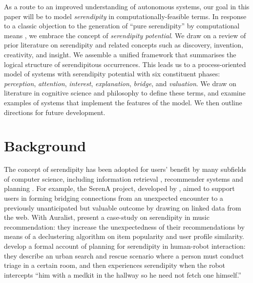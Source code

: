 As a route to an improved understanding of autonomous systems, our goal in this paper will be to model \emph{serendipity} in computationally-feasible terms. In response to a classic objection to the generation of ``pure serendipity'' by computational means \cite{van1994anatomy},  we embrace the concept of \emph{serendipity potential}.
We draw on a review of prior literature on serendipity and related concepts such as discovery, invention, creativity, and insight.  We assemble a unified framework that summarises the logical structure of serendipitous occurrences.
This leads us to a process-oriented model of systems with serendipity potential with six constituent phases:
\emph{perception}, \emph{attention}, \emph{interest}, \emph{explanation}, \emph{bridge}, and \emph{valuation}.
We draw on literature in cognitive science and philosophy to define these terms, and examine examples of systems that implement the features of the model.
We then outline directions for future development.

\section{Background} \label{sec:background}

The concept of serendipity has been adopted for users' benefit by many subfields of computer science, including information retrieval \cite{Toms2000, Andre:2009:XSP:1518701.1519009}, recommender systems \cite{kotkov2016survey} and planning \cite{muscettola1997board, chakraborti2015planning}. For example, the {\sf SerenA} project, developed by \citet{maxwell2012designing}, aimed to support users in forming bridging connections from an unexpected encounter to a previously unanticipated but valuable outcome by drawing on linked data from the web. With {\sf Auralist}, \citet{Zhang2011} present a case-study on serendipity in music recommendation: they increase the unexpectedness of their recommendations by means of a declustering algorithm on item popularity and user profile similarity. \citet{chakraborti2015planning} develop a formal account of planning for serendipity in human-robot interaction: they describe an urban search and rescue scenario where a person must conduct triage in a certain room, and then experiences serendipity when the robot intercepts ``him with a medkit in the hallway so he need not fetch one himself.''


